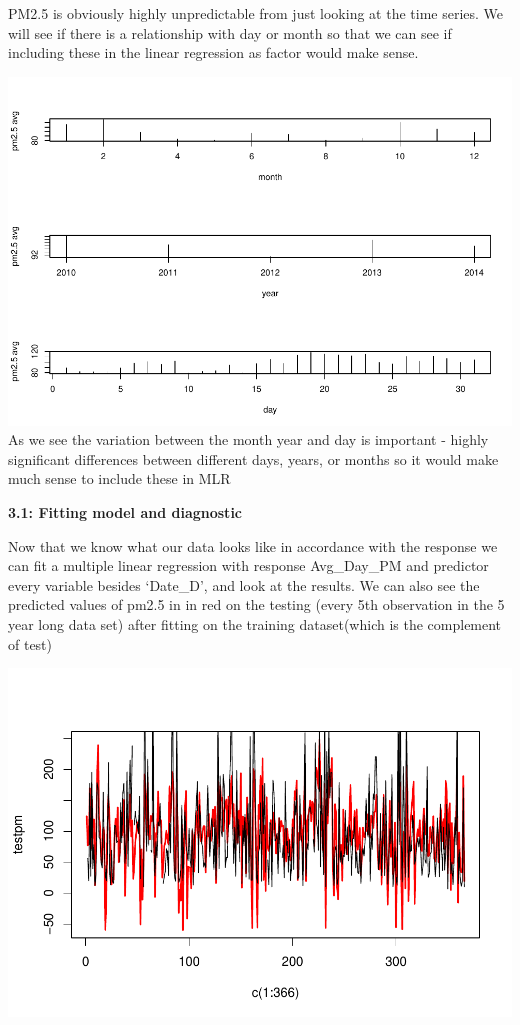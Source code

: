 \documentclass[
]{article}
\begin{document}
PM2.5 is obviously highly unpredictable from just looking at the time
series. We will see if there is a relationship with day or month so that
we can see if including these in the linear regression as factor would
make sense.

\includegraphics{Final_Project_2_files/figure-latex/unnamed-chunk-6-1.pdf}
As we see the variation between the month year and day is important -
highly significant differences between different days, years, or months
so it would make much sense to include these in MLR

\textbf{3.1: Fitting model and diagnostic}

Now that we know what our data looks like in accordance with the
response we can fit a multiple linear regression with response
Avg\_Day\_PM and predictor every variable besides `Date\_D', and look at
the results. We can also see the predicted values of pm2.5 in in red on
the testing (every 5th observation in the 5 year long data set) after
fitting on the training dataset(which is the complement of test)

\includegraphics{Final_Project_2_files/figure-latex/unnamed-chunk-7-1.pdf}
\end{document}

